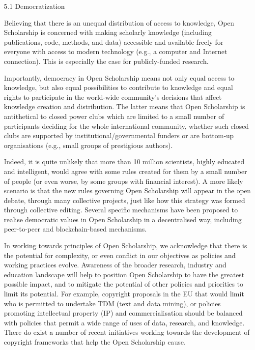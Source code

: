 \documentclass[]{article}
\begin{document}
5.1 Democratization

Believing that there is an unequal distribution of access to knowledge,
Open Scholarship is concerned with making scholarly knowledge (including
publications, code, methods, and data) accessible and available freely
for everyone with access to modern technology (e.g., a computer and
Internet connection). This is especially the case for publicly-funded
research.

Importantly, democracy in Open Scholarship means not only equal access
to knowledge, but also equal possibilities to contribute to knowledge
and equal rights to participate in the world-wide community's decisions
that affect knowledge creation and distribution. The latter means that
Open Scholarship is antithetical to closed power clubs which are limited
to a small number of participants deciding for the whole international
community, whether such closed clubs are supported by
institutional/governmental funders or are bottom-up organisations (e.g.,
small groups of prestigious authors).

Indeed, it is quite unlikely that more than 10 million scientists,
highly educated and intelligent, would agree with some rules created for
them by a small number of people (or even worse, by some groups with
financial interest). A more likely scenario is that the new rules
governing Open Scholarship will appear in the open debate, through many
collective projects, just like how this strategy was formed through
collective editing. Several specific mechanisms have been proposed to
realise democratic values in Open Scholarship in a decentralised way,
including peer-to-peer and blockchain-based mechanisms.

In working towards principles of Open Scholarship, we acknowledge that
there is the potential for complexity, or even conflict in our
objectives as policies and working practices evolve. Awareness of the
broader research, industry and education landscape will help to position
Open Scholarship to have the greatest possible impact, and to mitigate
the potential of other policies and priorities to limit its potential.
For example, copyright proposals in the EU that would limit who is
permitted to undertake TDM (text and data mining), or policies promoting
intellectual property (IP) and commercialisation should be balanced with
policies that permit a wide range of uses of data, research, and
knowledge. There do exist a number of recent initiatives working towards
the development of copyright frameworks that help the Open Scholarship
cause.
\end{document}
